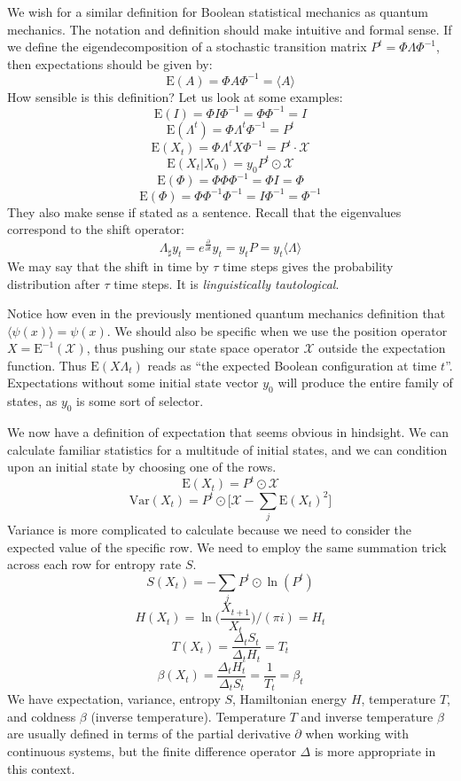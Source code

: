 \documentclass[10pt, a5paper, twoside, openright]{memoir}
\begin{document}
We wish for a similar definition for Boolean statistical mechanics as quantum mechanics. The notation and definition should make intuitive and formal sense. If we define the eigendecomposition of a stochastic transition matrix $P^t = \Phi \Lambda \Phi^{-1}$, then expectations should be given by:
$$\mathrm{E}(A) = \Phi A \Phi^{-1} = \langle A \rangle$$
How sensible is this definition? Let us look at some examples:
$$\mathrm{E}(I) = \Phi I \Phi^{-1} = \Phi \Phi^{-1} = I$$
$$\mathrm{E}(\Lambda^t) = \Phi \Lambda^t \Phi^{-1} = P^t$$
$$\mathrm{E}(X_t) = \Phi \Lambda^t X \Phi^{-1} = P^t \cdot \mathcal X$$
$$\mathrm{E}(X_t | X_0) = y_0 P^t \odot \mathcal X$$
$$\mathrm{E}(\Phi) = \Phi \Phi \Phi^{-1} = \Phi I = \Phi$$
$$\mathrm{E}(\Phi) = \Phi \Phi^{-1} \Phi^{-1} = I \Phi^{-1} = \Phi^{-1}$$
They also make sense if stated as a sentence. Recall that the eigenvalues correspond to the shift operator:
$$\Lambda_\sharp y_t = e^{\frac{\partial}{\partial t}} y_t = y_t P = y_t \langle \Lambda \rangle$$
We may say that the shift in time by $\tau$ time steps gives the probability distribution after $\tau$ time steps. It is \textit{linguistically tautological}.

Notice how even in the previously mentioned quantum mechanics definition that $\langle \psi(x) \rangle = \psi(x)$. We should also be specific when we use the position operator $X = \mathrm{E}^{-1}(\mathcal X)$, thus pushing our state space operator $\mathcal X$ outside the expectation function. Thus $\mathrm{E}(X \Lambda_t)$ reads as ``the expected Boolean configuration at time $t$''. Expectations without some initial state vector $y_0$ will produce the entire family of states, as $y_0$ is some sort of selector.

We now have a definition of expectation that seems obvious in hindsight. We can calculate familiar statistics for a multitude of initial states, and we can condition upon an initial state by choosing one of the rows.
$$\mathrm{E}(X_t) = P^t \odot \mathcal X$$
$$\mathrm{Var}(X_t) = P^t \odot \bigg [ \mathcal X - \sum\limits_{j} \mathrm{E}(X_t)^2 \bigg ]$$
Variance is more complicated to calculate because we need to consider the expected value of the specific row. We need to employ the same summation trick across each row for entropy rate $S$.
$$S(X_t) = -\sum\limits_{j} P^t \odot \ln(P^t)$$
$$H(X_t) = \ln \bigg (\frac{X_{t+1}}{X_{t}} \bigg ) / (\pi i) = H_t$$
$$T(X_t) = \frac{\Delta_t S_t}{\Delta_t H_t} = T_t$$
$$\beta(X_t) = \frac{\Delta_t H_t}{\Delta_t S_t} = \frac{1}{T_t} = \beta_t$$
We have expectation, variance, entropy $S$, Hamiltonian energy $H$, temperature $T$, and coldness $\beta$ (inverse temperature). Temperature $T$ and inverse temperature $\beta$ are usually defined in terms of the partial derivative $\partial$ when working with continuous systems, but the finite difference operator $\Delta$ is more appropriate in this context.
\end{document}
